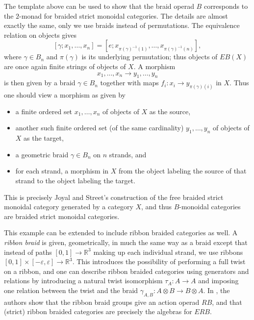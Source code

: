 \begin{example}
The template above can be used to show that the braid operad $B$ corresponds to the $2$-monad for braided strict monoidal categories. The details are almost exactly the same, only we use braids instead of permutations. The equivalence relation on objects gives
  \[
    [\gamma; x_{1}, \ldots, x_{n}] = \left[e; x_{\pi(\gamma)^{-1}(1)}, \ldots, x_{\pi(\gamma)^{-1}(n)}\right],
  \]
where $\gamma \in B_{n}$ and $\pi(\gamma)$ is its underlying permutation; thus objects of $EB(X)$ are once again finite strings of objects of $X$. A morphism
  \[
    x_{1}, \ldots, x_{n} \rightarrow y_{1}, \ldots, y_{n}
  \]
is then given by a braid $\gamma \in B_{n}$ together with maps $f_{i} \colon x_{i} \rightarrow y_{\pi(\gamma)(i)}$ in $X$. Thus one should view a morphism as given by
\begin{itemize}
\item a finite ordered set $x_{1}, \ldots, x_{n}$ of objects of $X$ as the source,
\item another such finite ordered set (of the same cardinality) $y_{1}, \ldots, y_{n}$ of objects of $X$ as the target,
\item a geometric braid $\gamma \in B_{n}$ on $n$ strands, and
\item for each strand, a morphism in $X$ from the object labeling the source of that strand to the object labeling the target.
\end{itemize}
This is precisely Joyal and Street's \cite{js} construction of the free braided strict monoidal category generated by a category $X$, and thus $B$-monoidal categories are braided strict monoidal categories.

This example can be extended to include ribbon braided categories as well. A \textit{ribbon braid} is given, geometrically, in much the same way as a braid except that instead of paths $[0,1] \rightarrow \mathbb{R}^{3}$ making up each individual strand, we use ribbons
$[0,1] \times [-\varepsilon, \varepsilon] \rightarrow \mathbb{R}^{3}$. This introduces the possibility of performing a full twist on a ribbon, and one can describe ribbon braided categories using generators and relations by introducing a natural twist isomorphism $\tau_{A} \colon A \rightarrow A$ and imposing one relation between the twist and the braid $\gamma_{A,B} \colon A \otimes B \rightarrow B \otimes A$. In \cite{sal-wahl}, the authors show that the ribbon braid groups give an action operad $RB$, and that (strict) ribbon braided categories are precisely the algebras for $ERB$.
\end{example}

